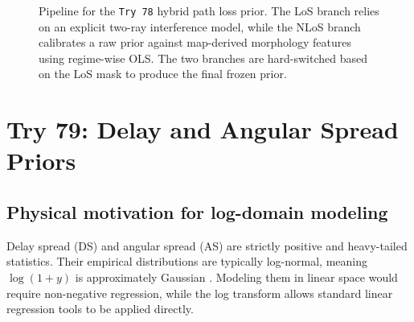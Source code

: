 \documentclass[11pt,a4paper]{article}
\begin{document}
\begin{figure}[H]
\caption{Pipeline for the \texttt{Try 78} hybrid path loss prior. The LoS branch relies on an explicit two-ray interference model, while the NLoS branch calibrates a raw prior against map-derived morphology features using regime-wise OLS. The two branches are hard-switched based on the LoS mask to produce the final frozen prior.}
\label{fig:try78_pipeline}
\end{figure}

\section{Try 79: Delay and Angular Spread Priors}

\subsection{Physical motivation for log-domain modeling}

Delay spread (DS) and angular spread (AS) are strictly positive and
heavy-tailed statistics. Their empirical distributions are typically
log-normal, meaning $\log(1 + y)$ is approximately Gaussian
\cite{tr38901,winner2}. Modeling them in linear space would require
non-negative regression, while the log transform allows standard linear
regression tools to be applied directly.
\end{document}
